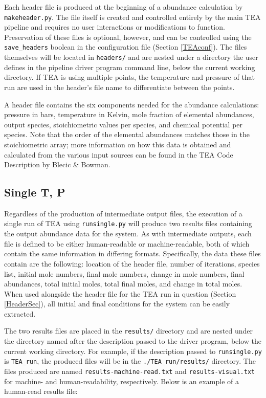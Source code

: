 {Each header file is produced at the beginning of a 
abundance calculation by \newline \texttt{makeheader.py}.  The file
itself is created and controlled entirely by the main TEA pipeline and
requires no user interactions or modifications to function.
Preservation of these files is optional, however, and can be
controlled using the
\texttt{save\_headers} boolean in the configuration file (Section
\ref{TEAconf}).  The files themselves will be located in \texttt{headers/}
and are nested under a directory the user defines in the pipeline
driver program command line, below the current working directory. If
TEA is using multiple  points, the temperature and pressure
of that run are used in the header's file name to differentiate
between the points.

A header file contains the six components needed for the abundance
calculations: pressure in bars, temperature in Kelvin, mole fraction
of elemental abundances, output species, stoichiometric values per
species, and chemical potential per species.  Note that the order of
the elemental abundances matches those in the stoichiometric array;
more information on how this data is obtained and calculated from the
various input sources can be found in the TEA Code Description by
Blecic
\& Bowman.



\subsection{Single T, P}
\label{SingleTPSec}
  Regardless of the production of intermediate output files, the
  execution of a single  run of TEA
  using \texttt{runsingle.py} will produce two results files
  containing the output abundance data for the system.  As with
  intermediate outputs, each file is defined to be either
  human-readable or machine-readable, both of which contain the same
  information in differing formats.  Specifically, the data these
  files contain are the following: location of the header file, number
  of iterations, species list, initial mole numbers, final mole
  numbers, change in mole numbers, final abundances, total initial
  moles, total final moles, and change in total moles.  When used
  alongside the header file for the TEA run in question
  (Section \ref{HeaderSec}), all initial and final conditions for the
  system can be easily extracted.

  The two results files are placed in the \texttt{results/} directory and are
  nested under the directory named after the description passed to the
  driver program, below the current working directory. For example,
  if the description passed to \texttt{runsingle.py} is \texttt{TEA\_run},
  the produced files will be in the \texttt{./TEA\_run/results/} directory.
  The files produced are named \texttt{results-machine-read.txt} and
  \texttt{results-visual.txt} for machine- and \newline human-readability,
  respectively.  Below is an example of a human-read results file:

}
